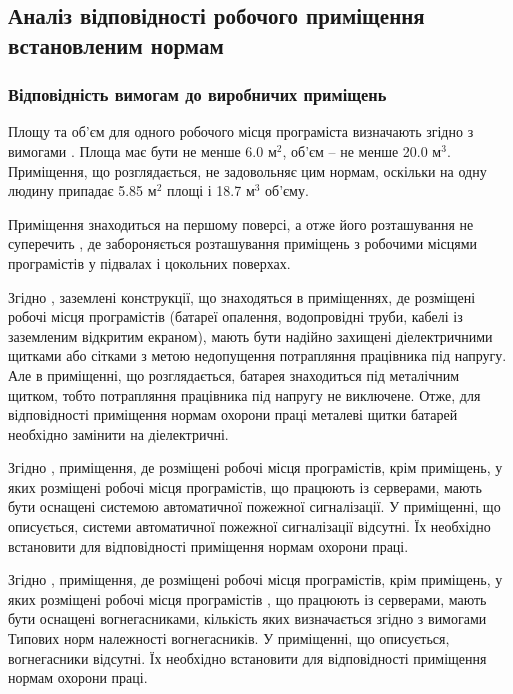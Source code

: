\documentclass[a4paper,12pt]{article}
\begin{document}
\subsection{Аналіз відповідності робочого приміщення встановленим нормам}
\subsubsection{Відповідність вимогам до виробничих приміщень}
Площу  та  об'єм  для  одного  робочого місця програміста визначають згідно з вимогами \cite{sanpin798}. Площа має бути не менше 6.0 $\text{м}^2$, об'єм -- не менше 20.0 $\text{м}^3$. Приміщення, що розглядається, не задовольняє цим нормам, оскільки на одну людину припадає 5.85 $\text{м}^2$ площі і 18.7 $\text{м}^3$ об’єму.

Приміщення знаходиться на першому поверсі, а отже його розташування не суперечить \cite{sanpin798}, де забороняється розташування приміщень з робочими місцями  програмістів у підвалах і цокольних поверхах.

Згідно \cite{npaop1210}, заземлені конструкції, що знаходяться в приміщеннях, де розміщені робочі місця програмістів (батареї опалення,  водопровідні труби, кабелі із заземленим відкритим екраном), мають бути надійно захищені діелектричними щитками або сітками  з  метою  недопущення потрапляння працівника під напругу. Але в приміщенні, що розглядається, батарея знаходиться під металічним щитком, тобто потрапляння працівника під напругу не виключене. Отже, для відповідності приміщення нормам охорони праці металеві щитки батарей необхідно замінити на діелектричні.

Згідно \cite{npaop1210}, приміщення, де розміщені робочі місця програмістів, крім приміщень, у яких розміщені робочі місця програмістів, що працюють із серверами, мають бути оснащені системою автоматичної пожежної сигналізації. У приміщенні, що описується, системи автоматичної пожежної сигналізації відсутні. Їх необхідно встановити для відповідності приміщення нормам охорони праці.

Згідно \cite{npaop1210}, приміщення, де розміщені робочі місця програмістів, крім приміщень, у яких розміщені робочі місця програмістів , що працюють із серверами, мають бути оснащені вогнегасниками, кількість яких визначається згідно з вимогами Типових норм належності вогнегасників. У приміщенні, що описується, вогнегасники відсутні. Їх необхідно встановити для відповідності приміщення нормам охорони праці.
\end{document}
